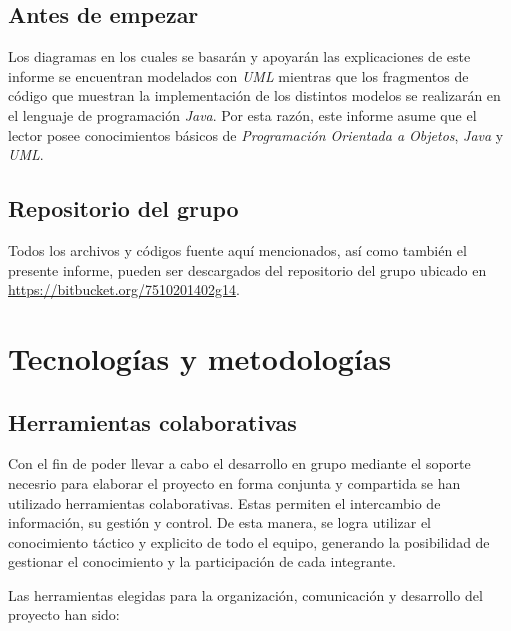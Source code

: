 \documentclass[oneside]{book}
\begin{document}
%
%
\section*{\bfseries\color{black}Antes de empezar}

Los diagramas en los cuales se basarán y apoyarán las explicaciones de este informe se encuentran modelados con \textit{UML} mientras que los fragmentos de código que muestran la implementación de los distintos modelos se realizarán en el lenguaje de programación \textit{Java}. Por esta razón, este informe asume que el lector posee conocimientos básicos de \textit{Programación Orientada a Objetos}, \textit{Java} y \textit{UML}.
\bigskip


\section*{\bfseries\color{black}Repositorio del grupo}

Todos los archivos y códigos fuente aquí mencionados, así como también el presente informe, pueden ser descargados del repositorio del grupo ubicado en  \url{https://bitbucket.org/7510201402g14}.
\bigskip



\tableofcontents

\setcounter{page}{0}
\thispagestyle{empty}











%
%
\chapter{Tecnologías y metodologías}


\section{Herramientas colaborativas}

	Con el fin de poder llevar a cabo el desarrollo en grupo mediante el soporte necesrio para elaborar el proyecto en forma conjunta y compartida se han utilizado herramientas colaborativas. Estas permiten el intercambio de información, su gestión y control. De esta manera, se logra utilizar el conocimiento táctico y explicito de todo el equipo, generando la posibilidad de gestionar el conocimiento y la participación de cada integrante.
	\par
	Las herramientas elegidas para la organización, comunicación y desarrollo del proyecto han sido:
\end{document}
